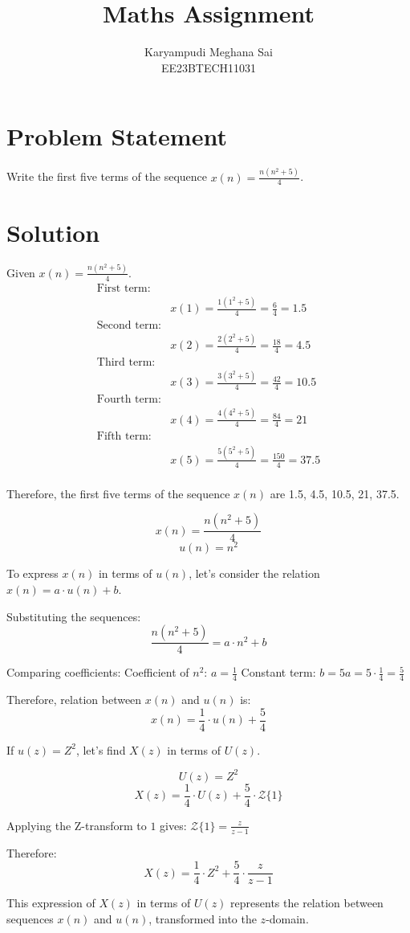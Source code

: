 \documentclass[12pt]{article}
\begin{document}
\title{Maths Assignment}
\author{Karyampudi Meghana Sai\\
        EE23BTECH11031}
\maketitle
\section*{Problem Statement}
Write the first five terms of the sequence \(x(n) = \frac{n(n^2+5)}{4}\).
\section*{Solution}
Given \(x(n) = \frac{n(n^2+5)}{4}\).
\[
\begin{aligned}
\text{First term:}\\\quad &x(1) = \frac{1(1^2 + 5)}{4} = \frac{6}{4} = 1.5 \\
\text{Second term:}\\\quad &x(2) = \frac{2(2^2 + 5)}{4} = \frac{18}{4} = 4.5 \\
\text{Third term:}\\\quad &x(3) = \frac{3(3^2 + 5)}{4} = \frac{42}{4} = 10.5 \\
\text{Fourth term:}\\\quad &x(4) = \frac{4(4^2 + 5)}{4} = \frac{84}{4} = 21 \\
\text{Fifth term:}\\\quad &x(5) = \frac{5(5^2 + 5)}{4} = \frac{150}{4} = 37.5 \\
\end{aligned}
\]

Therefore, the first five terms of the sequence \(x(n)\) are 1.5, 4.5, 10.5, 21, 37.5.


\[x(n) = \frac{n(n^2+5)}{4}\]
\[u(n) = n^2\]

To express \(x(n)\) in terms of \(u(n)\), let's consider the relation \(x(n) = a \cdot u(n) + b\).

Substituting the sequences:
\[\frac{n(n^2+5)}{4} = a \cdot n^2 + b\]

Comparing coefficients:
Coefficient of \(n^2\): \(a = \frac{1}{4}\)
Constant term: \(b = 5a = 5 \cdot \frac{1}{4} = \frac{5}{4}\)

Therefore, relation between \(x(n)\) and \(u(n)\) is:
\[x(n) = \frac{1}{4} \cdot u(n) + \frac{5}{4}\]

If \(u(z) = Z^2\), let's find \(X(z)\) in terms of \(U(z)\).

\[U(z) = Z^2\]
\[X(z) = \frac{1}{4} \cdot U(z) + \frac{5}{4} \cdot \mathcal{Z}\{1\}\]

Applying the Z-transform to \(1\) gives: \(\mathcal{Z}\{1\} = \frac{z}{z-1}\)

Therefore:
\[X(z) = \frac{1}{4} \cdot Z^2 + \frac{5}{4} \cdot \frac{z}{z-1}\]

This expression of \(X(z)\) in terms of \(U(z)\) represents the relation between sequences \(x(n)\) and \(u(n)\), transformed into the \(z\)-domain.
\end{document}
